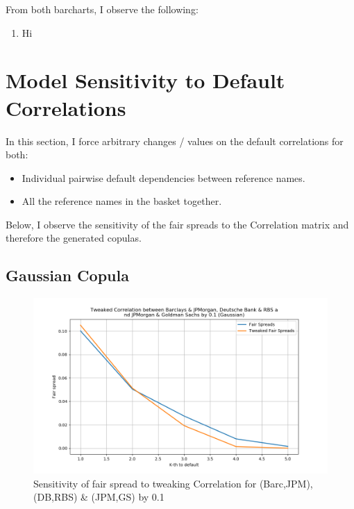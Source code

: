 \documentclass{report}
\theoremstyle{plain}
\theoremstyle{definition}
\begin{document}
From both barcharts, I observe the following:
\begin{enumerate}
	\item Hi
\end{enumerate}


\section{Model Sensitivity to Default Correlations}

In this section, I force arbitrary changes / values on the default correlations for both:
\begin{itemize}
	\item Individual pairwise default dependencies between reference names.
	\item All the reference names in the basket together. 
\end{itemize}

Below, I observe the sensitivity of the fair spreads to the Correlation matrix and therefore the generated copulas.

\subsection{Gaussian Copula}

\begin{figure}[H]
	\begin{center}
		\includegraphics[width=15cm]{Tweaked_Correlation_between_Barclays_&_JPMorgan,_Deutsche_Bank_&_RBS_and_JPMorgan_&_Goldman_Sachs_by_0,1_(Gaussian).png}
		\caption{Sensitivity of fair spread to tweaking Correlation for (Barc,JPM), (DB,RBS) \& (JPM,GS) by 0.1} 
		\label{Tweaked_Correlation_between_Barclays_&_JPMorgan,_Deutsche_Bank_&_RBS_and_JPMorgan_&_Goldman_Sachs_by_0.1_(Gaussian)}
	\end{center}
\end{figure}
\end{document}

